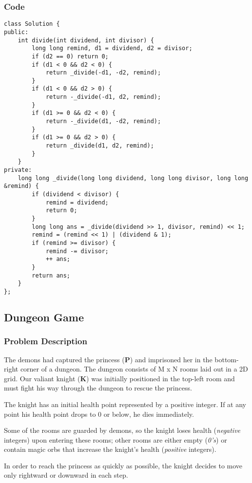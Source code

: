 \documentclass[courier]{article}
\begin{document}
\begin{CJK*}{UTF8}{gkai}
\subsubsection*{Code}
\begin{lstlisting}
class Solution {
public:
    int divide(int dividend, int divisor) {
        long long remind, d1 = dividend, d2 = divisor;
        if (d2 == 0) return 0;
        if (d1 < 0 && d2 < 0) {
            return _divide(-d1, -d2, remind);
        }
        if (d1 < 0 && d2 > 0) {
            return -_divide(-d1, d2, remind);
        }
        if (d1 >= 0 && d2 < 0) {
            return -_divide(d1, -d2, remind);
        }
        if (d1 >= 0 && d2 > 0) {
            return _divide(d1, d2, remind);
        }
    }
private:
    long long _divide(long long dividend, long long divisor, long long &remind) {
        if (dividend < divisor) {
            remind = dividend;
            return 0;
        }
        long long ans = _divide(dividend >> 1, divisor, remind) << 1;
        remind = (remind << 1) | (dividend & 1);
        if (remind >= divisor) {
            remind -= divisor;
            ++ ans;
        }
        return ans;
    }
}; 
\end{lstlisting}


\subsection{ Dungeon Game }

\subsubsection*{Problem Description}
The demons had captured the princess (\textbf{P}) and imprisoned her in the bottom-right corner of a dungeon. The dungeon consists of M x N rooms laid out in a 2D grid. Our valiant knight (\textbf{K}) was initially positioned in the top-left room and must fight his way through the dungeon to rescue the princess.

The knight has an initial health point represented by a positive integer. If at any point his health point drops to 0 or below, he dies immediately.

Some of the rooms are guarded by demons, so the knight loses health (\emph{negative} integers) upon entering these rooms; 
other rooms are either empty (\emph{0's}) or contain magic orbs that increase the knight's health (\emph{positive} integers).

In order to reach the princess as quickly as possible, the knight decides to move only rightward or downward in each step.


\end{CJK*}
\end{document}
